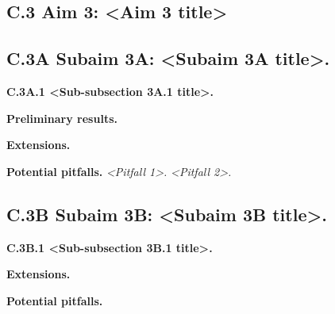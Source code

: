 
\aimthreetrue

\subsection{C.3 Aim 3: <Aim 3 title>}\label{c.3-aim-3}

\lipsum[16]

\subsection{C.3A Subaim 3A: <Subaim 3A title>.}\label{c.3a}

\textbf{C.3A.1 <Sub-subsection 3A.1 title>.}
\lipsum[17]

\textbf{Preliminary results.}

\textbf{Extensions.}

\textbf{Potential pitfalls.}
\emph{<Pitfall 1>.} %
\emph{<Pitfall 2>.} %

\subsection{C.3B Subaim 3B: <Subaim 3B title>.}\label{c.3b}

\textbf{C.3B.1 <Sub-subsection 3B.1 title>.}

\textbf{Extensions.}

\textbf{Potential pitfalls.}
